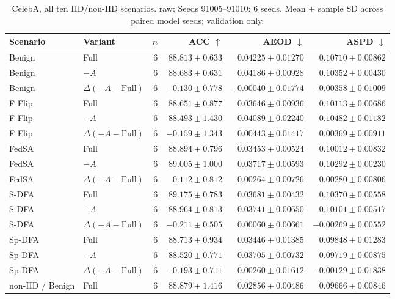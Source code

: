 \begin{table}[t]
\centering
\small
\caption{CelebA, all ten IID/non-IID scenarios. raw; Seeds 91005–91010: 6 seeds. Mean $\pm$ sample SD across paired model seeds; validation only.}
\begin{tabular}{llrrrr}
\toprule
Scenario & Variant & $n$ & ACC $\uparrow$ & AEOD $\downarrow$ & ASPD $\downarrow$ \\
\midrule
Benign & Full & 6 & $88.813 \pm 0.633$ & $0.04225 \pm 0.01270$ & $0.10710 \pm 0.00862$ \\
Benign & $-A$ & 6 & $88.683 \pm 0.631$ & $0.04186 \pm 0.00928$ & $0.10352 \pm 0.00430$ \\
Benign & $\Delta(-A-\mathrm{Full})$ & 6 & $-0.130 \pm 0.778$ & $-0.00040 \pm 0.01774$ & $-0.00358 \pm 0.01009$ \\
F Flip & Full & 6 & $88.651 \pm 0.877$ & $0.03646 \pm 0.00936$ & $0.10113 \pm 0.00686$ \\
F Flip & $-A$ & 6 & $88.493 \pm 1.430$ & $0.04089 \pm 0.02240$ & $0.10482 \pm 0.01182$ \\
F Flip & $\Delta(-A-\mathrm{Full})$ & 6 & $-0.159 \pm 1.343$ & $0.00443 \pm 0.01417$ & $0.00369 \pm 0.00911$ \\
FedSA & Full & 6 & $88.894 \pm 0.796$ & $0.03453 \pm 0.00524$ & $0.10012 \pm 0.00832$ \\
FedSA & $-A$ & 6 & $89.005 \pm 1.000$ & $0.03717 \pm 0.00593$ & $0.10292 \pm 0.00230$ \\
FedSA & $\Delta(-A-\mathrm{Full})$ & 6 & $0.112 \pm 0.812$ & $0.00264 \pm 0.00726$ & $0.00280 \pm 0.00806$ \\
S-DFA & Full & 6 & $89.175 \pm 0.783$ & $0.03681 \pm 0.00432$ & $0.10370 \pm 0.00558$ \\
S-DFA & $-A$ & 6 & $88.964 \pm 0.813$ & $0.03741 \pm 0.00650$ & $0.10101 \pm 0.00517$ \\
S-DFA & $\Delta(-A-\mathrm{Full})$ & 6 & $-0.211 \pm 0.505$ & $0.00060 \pm 0.00661$ & $-0.00269 \pm 0.00552$ \\
Sp-DFA & Full & 6 & $88.713 \pm 0.934$ & $0.03446 \pm 0.01385$ & $0.09848 \pm 0.01283$ \\
Sp-DFA & $-A$ & 6 & $88.520 \pm 0.771$ & $0.03705 \pm 0.00732$ & $0.09719 \pm 0.00875$ \\
Sp-DFA & $\Delta(-A-\mathrm{Full})$ & 6 & $-0.193 \pm 0.711$ & $0.00260 \pm 0.01612$ & $-0.00129 \pm 0.01838$ \\
non-IID / Benign & Full & 6 & $88.879 \pm 1.416$ & $0.02856 \pm 0.00486$ & $0.09666 \pm 0.00846$ \\

\end{tabular}
\end{table}
